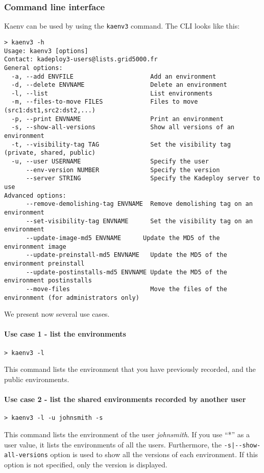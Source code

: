 \documentclass[a4wide,10pt,oneside]{book}
\begin{document}
\subsubsection{Command line interface}
Kaenv can be used by using the \texttt{kaenv3} command. The CLI looks like this:
\begin{small}
\begin{verbatim}
> kaenv3 -h
Usage: kaenv3 [options]
Contact: kadeploy3-users@lists.grid5000.fr
General options:
  -a, --add ENVFILE                     Add an environment
  -d, --delete ENVNAME                  Delete an environment
  -l, --list                            List environments
  -m, --files-to-move FILES             Files to move (src1:dst1,src2:dst2,...)
  -p, --print ENVNAME                   Print an environment
  -s, --show-all-versions               Show all versions of an environment
  -t, --visibility-tag TAG              Set the visibility tag (private, shared, public)
  -u, --user USERNAME                   Specify the user
      --env-version NUMBER              Specify the version
      --server STRING                   Specify the Kadeploy server to use
Advanced options:
      --remove-demolishing-tag ENVNAME  Remove demolishing tag on an environment
      --set-visibility-tag ENVNAME      Set the visibility tag on an environment
      --update-image-md5 ENVNAME      Update the MD5 of the environment image
      --update-preinstall-md5 ENVNAME   Update the MD5 of the environment preinstall
      --update-postinstalls-md5 ENVNAME Update the MD5 of the environment postinstalls
      --move-files                      Move the files of the environment (for administrators only)
\end{verbatim}
\end{small}

We present now several use cases.
\paragraph{Use case 1 - list the environments}
\begin{verbatim}
> kaenv3 -l
\end{verbatim}
This command lists the environment that you have previously recorded, and the public environments.

\paragraph{Use case 2 - list the shared environments recorded by another user}
\begin{verbatim}
> kaenv3 -l -u johnsmith -s
\end{verbatim}
This command lists the environment of the user \textit{johnsmith}. If you use ``*'' as a user value, it lists the environments of all the users. Furthermore, the \texttt{-s|-{}-show-all-versions} option is used to show all the versions of each environment. If this option is not specified, only the version is displayed.
\end{document}
